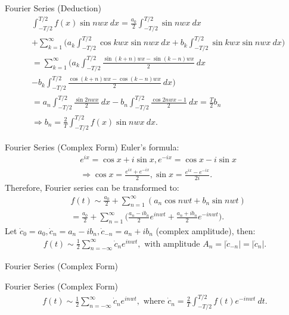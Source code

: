 \documentclass{beamer}
\begin{document}
	\begin{frame}{Fourier Series (Deduction)}
		\begin{align*}
			& \int_{-T/2}^{T/2}f(x)\sin nwx\ dx = \frac{a_0}{2}\int_{-T/2}^{T/2} \sin nwx\ dx \\
			& + \sum_{k=1}^{\infty}\big(a_k\int_{-T/2}^{T/2}\cos kwx \sin nwx\ dx + b_k\int_{-T/2}^{T/2}\sin kwx \sin nwx\ dx\big) \\
			& = \sum_{k=1}^{\infty}\big(a_k\int_{-T/2}^{T/2}\frac{\sin (k+n)wx - \sin (k-n)wx}{2}\ dx \\
			& - b_k\int_{-T/2}^{T/2}\frac{\cos (k+n)wx - \cos (k-n)wx}{2}\ dx\big) \\
			& = a_n\int_{-T/2}^{T/2}\frac{\sin 2nwx}{2}\ dx - b_n\int_{-T/2}^{T/2}\frac{\cos 2nwx - 1}{2}\ dx = \frac{T}{2}b_n \\
			& \Longrightarrow b_n = \frac{2}{T} \int_{-T/2}^{T/2}f(x)\sin nwx\ dx.
		\end{align*}
	\end{frame}
	\begin{frame}{Fourier Series (Complex Form)}
		Euler's formula:
		\begin{align*}
			& e^{ix} = \cos x + i\sin x, e^{-ix} = \cos x - i\sin x \\
			& \Longrightarrow \cos x = \frac{e^{ix} + e^{-ix}}{2}, \sin x = \frac{e^{ix}-e^{-ix}}{2i}.
		\end{align*}
		Therefore, Fourier series can be transformed to:
		\begin{align*}
			& f(t) \sim \frac{a_0}{2} + \sum_{n=1}^{\infty}(a_n\cos nwt + b_n\sin nwt) \\
			&  = \frac{a_0}{2} + \sum_{n=1}^{\infty}\big(\frac{a_n-ib_n}{2}e^{inwt} + \frac{a_n + ib_n}{2}e^{-inwt}\big).
		\end{align*}
		Let $\dot{c}_0 = a_0, \dot{c}_n = a_n-ib_n, \dot{c}_{-n} = a_n + ib_n$ (complex amplitude), then:
		\begin{align*}
			f(t) \sim \frac{1}{2}\sum_{n=-\infty}^{\infty}\dot{c}_ne^{inwt}, \text{ with amplitude }A_n = |\dot{c}_{-n}| = |\dot{c}_{n}|.
		\end{align*}
	\end{frame}

	\begin{frame}{Fourier Series (Complex Form)}
		\begin{block}{Fourier Series (Complex Form)}
			\begin{align*}
				f(t) \sim \frac{1}{2}\sum_{n=-\infty}^{\infty}\dot{c}_ne^{inwt}, \text{ where }\dot{c}_n = \frac{2}{T}\int_{-T/2}^{T/2}f(t)e^{-inwt}\ dt.
			\end{align*}
		\end{block}
	\end{frame}
	
\end{document}
